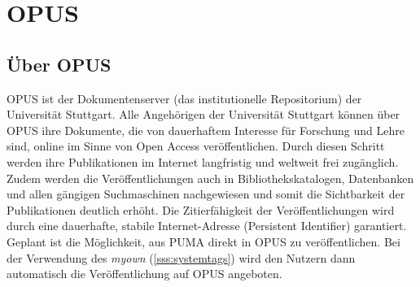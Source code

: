 \section{OPUS}
\label{sec:opus}
\subsection{Über OPUS}
\label{subsec:ueberOpus}
OPUS ist der Dokumentenserver (das institutionelle Repositorium) der Universität Stuttgart. Alle Angehörigen der Universität Stuttgart können über OPUS ihre Dokumente, die von dauerhaftem Interesse für Forschung und Lehre sind, online im Sinne von Open Access veröffentlichen. Durch diesen Schritt werden ihre Publikationen im Internet langfristig und weltweit frei zugänglich. Zudem werden die Veröffentlichungen auch in Bibliothekskatalogen, Datenbanken und allen gängigen Suchmaschinen nachgewiesen und somit die Sichtbarkeit der Publikationen deutlich erhöht. Die Zitierfähigkeit der Veröffentlichungen wird durch eine dauerhafte, stabile Internet-Adresse (Persistent Identifier) garantiert.
\newline\newline
Geplant ist die Möglichkeit, aus PUMA direkt in OPUS zu veröffentlichen. Bei der Verwendung des \tags \textit{myown} (\autoref{sss:systemtags}) wird den Nutzern dann automatisch die Veröffentlichung auf OPUS angeboten.  

